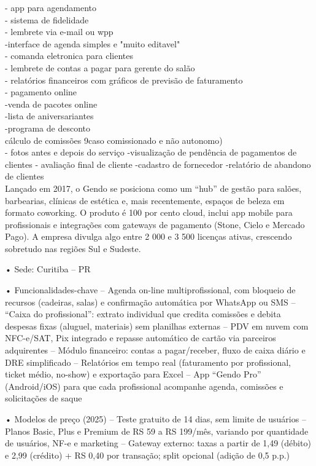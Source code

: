 
- app para agendamento\\
- sistema de fidelidade\\
- lembrete via e-mail ou wpp\\
-interface de agenda simples e "muito editavel"\\
- comanda eletronica para clientes\\
- lembrete de contas a pagar para gerente do salão\\
- relatórios financeiros com gráficos de previsão de faturamento\\
- pagamento online\\
-venda de pacotes online\\
-lista de aniversariantes\\
-programa de desconto\\
cálculo de comissões 9caso comissionado e não autonomo)\\
- fotos antes e depois do serviço
-visualização de pendência de pagamentos de clientes
- avaliação final de cliente
-cadastro de fornecedor
-relatório de abandono de clientes\\
Lançado em 2017, o Gendo se posiciona como um “hub” de gestão para salões, barbearias, clínicas de estética e, mais recentemente, espaços de beleza em formato coworking. O produto é 100 por cento cloud, inclui app mobile para profissionais e integrações com gateways de pagamento (Stone, Cielo e Mercado Pago). A empresa divulga algo entre 2 000 e 3 500 licenças ativas, crescendo sobretudo nas regiões Sul e Sudeste.

• Sede: Curitiba – PR

• Funcionalidades-chave
– Agenda on-line multi­profissional, com bloqueio de recursos (cadeiras, salas) e confirmação automática por WhatsApp ou SMS
– “Caixa do profissional”: extrato individual que credita comissões e debita despesas fixas (aluguel, materiais) sem planilhas externas
– PDV em nuvem com NFC-e/SAT, Pix integrado e repasse automático de cartão via parceiros adquirentes
– Módulo financeiro: contas a pagar/receber, fluxo de caixa diário e DRE simplificado
– Relatórios em tempo real (faturamento por profissional, ticket médio, no-show) e exportação para Excel
– App “Gendo Pro” (Android/iOS) para que cada profissional acompanhe agenda, comissões e solicitações de saque

• Modelos de preço (2025)
– Teste gratuito de 14 dias, sem limite de usuários
– Planos Basic, Plus e Premium de RS 59 a RS 199/mês, variando por quantidade de usuários, NF-e e marketing
– Gateway externo: taxas a partir de 1,49  (débito) e 2,99  (crédito) + RS 0,40 por transação; split opcional (adição de 0,5 p.p.)


